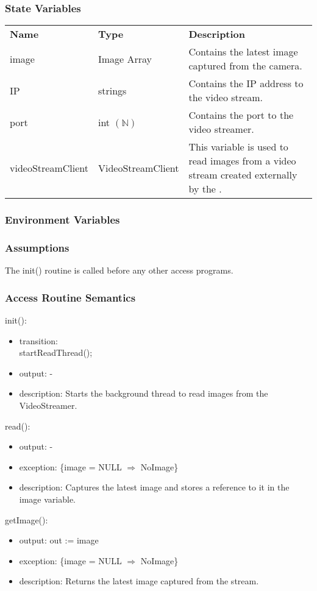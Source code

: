 \documentclass[12pt, titlepage]{article}
\begin{document}
\subsubsection{State Variables}
\begin{center}
\begin{tabular}{p{3 cm} p{3.2cm} p{6.5cm} }
\hline
\textbf{Name} & \textbf{Type} & \textbf{Description}  \\
image & Image Array & Contains the latest image captured from the camera. \\
IP &  strings & Contains the IP address to the video stream. \\
port & int $(\mathbb{N})$ & Contains the port to the video streamer. \\
videoStreamClient & VideoStreamClient & This variable is used to read images from a video stream created externally by the \nameref{Drone Camera}.   \\
\hline
\hline
\end{tabular}
\end{center}
\subsubsection{Environment Variables}
\subsubsection{Assumptions}
The init() routine is called before any other access programs.
\subsubsection{Access Routine Semantics}
\noindent init():
\begin{itemize}
\item transition:\\startReadThread();
\item output: -
\item description: Starts the background thread to read images from the VideoStreamer.
\end{itemize}
\noindent read():
\begin{itemize}
\item output: -
\item exception: \{image = NULL $\Rightarrow$ NoImage\}
\item description: Captures the latest image and stores a reference to it in the image variable. 
\end{itemize}
\noindent getImage():
\begin{itemize}
\item output: out := image 
\item exception: \{image = NULL $\Rightarrow$ NoImage\}
\item description: Returns the latest image captured from the stream. 
\end{itemize}
\end{document}
